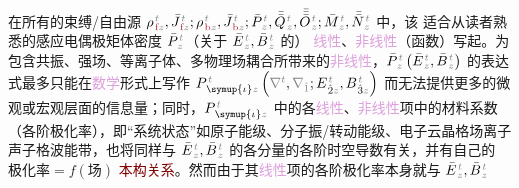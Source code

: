 在所有的束缚/自由源 ${\rho}^{\;\!\mathcolor{gray}{t}}_{\;\!\textcolor{Maroon}{\text{f}}\mathcolor{gray}{z}}, \bar{J}^{\;\!\mathcolor{gray}{t}}_{\;\!\textcolor{Maroon}{\text{f}}\mathcolor{gray}{z}};{\rho}^{\;\!\mathcolor{gray}{t}}_{\;\!\textcolor{Maroon}{\text{b}}\mathcolor{gray}{z}}, \bar{J}^{\;\!\mathcolor{gray}{t}}_{\;\!\textcolor{Maroon}{\text{b}}\mathcolor{gray}{z}};\bar{P}^{\;\!\mathcolor{gray}{t}}_{\;\!\mathcolor{gray}{z}},\bar{\bar{Q}}^{\;\!\mathcolor{gray}{t}}_{\;\!\mathcolor{gray}{z}},\bar{\bar{\bar{O}}}^{\;\!\mathcolor{gray}{t}}_{\;\!\mathcolor{gray}{z}} ; \bar{M}^{\;\!\mathcolor{gray}{t}}_{\;\!\mathcolor{gray}{z}}, \bar{\bar{N}}^{\;\!\mathcolor{gray}{t}}_{\;\!\mathcolor{gray}{z}}$ 中，该  适合从读者熟悉的感应电偶极矩体密度 $\bar{P}^{\;\!\mathcolor{gray}{t}}_{\;\!\mathcolor{gray}{z}}$（关于 $\bar{E}^{\;\!\mathcolor{gray}{t}}_{\;\!\mathcolor{gray}{z}}, \bar{B}^{\;\!\mathcolor{gray}{t}}_{\;\!\mathcolor{gray}{z}}$ 的） \textcolor{Plum}{线性}、\textcolor{Plum}{非线性}（函数）写起。为包含\textcolor{NavyBlue}{共振}、强场、等离子体、\textcolor{NavyBlue}{多物理场耦合}所带来的\textcolor{Plum}{非线性}，$\bar{P}^{\;\!\mathcolor{gray}{t}}_{\;\!\mathcolor{gray}{z}} \left( \bar{E}^{\;\!\mathcolor{gray}{t}}_{\;\!\mathcolor{gray}{z}}, \bar{B}^{\;\!\mathcolor{gray}{t}}_{\;\!\mathcolor{gray}{z}} \right)$ 的表达式最多只能在\textcolor{Plum}{数学}形式上写作 $P^{\;\!\mathcolor{gray}{t}}_{\;\! \symup{\iota}\mathcolor{gray}{z}} \left( \mathcolor{gray}{\nabla^t}, \mathcolor{gray}{\nabla_{\hat{1}}} ; E^{\;\!\mathcolor{gray}{t}}_{\;\! \hat{2}\mathcolor{gray}{z}}, B^{\;\!\mathcolor{gray}{t}}_{\;\! \hat{3}\mathcolor{gray}{z}} \right)$ 而无法提供更多的微观或宏观层面的信息量；同时，$P^{\;\!\mathcolor{gray}{t}}_{\;\! \symup{\iota}\mathcolor{gray}{z}}$ 中的各\textcolor{Plum}{线性}、\textcolor{Plum}{非线性}项中的材料系数（各阶极化率），即“系统状态”如原子能级、分子振/转动能级、电子云晶格场离子声子格波能带，也将同样与 $\bar{E}^{\;\!\mathcolor{gray}{t}}_{\;\!\mathcolor{gray}{z}}, \bar{B}^{\;\!\mathcolor{gray}{t}}_{\;\!\mathcolor{gray}{z}}$ 的各分量的各阶时空导数有关，并有自己的$\text{极化率} = f(\text{场})$ \textcolor{Maroon}{本构关系}。然而由于其\textcolor{Plum}{线性}项的各阶极化率本身就与 $\bar{E}^{\;\!\mathcolor{gray}{t}}_{\;\!\mathcolor{gray}{z}}, \bar{B}^{\;\!\mathcolor{gray}{t}}_{\;\!\mathcolor{gray}{z}}$ 